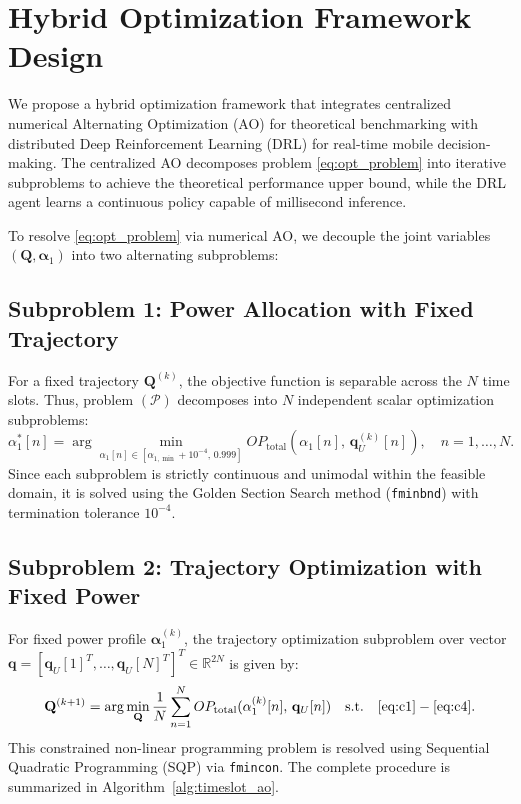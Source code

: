 \section{Hybrid Optimization Framework Design}
\label{sec:framework_design}

We propose a hybrid optimization framework that integrates centralized numerical Alternating Optimization (AO) for theoretical benchmarking with distributed Deep Reinforcement Learning (DRL) for real-time mobile decision-making. The centralized AO decomposes problem \eqref{eq:opt_problem} into iterative subproblems to achieve the theoretical performance upper bound, while the DRL agent learns a continuous policy capable of millisecond inference.

To resolve \eqref{eq:opt_problem} via numerical AO, we decouple the joint variables $(\mathbf{Q}, \boldsymbol{\alpha}_1)$ into two alternating subproblems:

\subsection{Subproblem 1: Power Allocation with Fixed Trajectory}
For a fixed trajectory $\mathbf{Q}^{(k)}$, the objective function is separable across the $N$ time slots. Thus, problem $(\mathcal{P})$ decomposes into $N$ independent scalar optimization subproblems:
\begin{equation}
    \alpha_1^*[n] = \arg\min_{\alpha_1[n] \in [\alpha_{1,\min} + 10^{-4}, \, 0.999]} OP_{\text{total}}(\alpha_1[n], \, \mathbf{q}_U^{(k)}[n]), \quad n = 1, \dots, N.
\end{equation}
Since each subproblem is strictly continuous and unimodal within the feasible domain, it is solved using the Golden Section Search method (\texttt{fminbnd}) with termination tolerance $10^{-4}$.

\subsection{Subproblem 2: Trajectory Optimization with Fixed Power}
For fixed power profile $\boldsymbol{\alpha}_1^{(k)}$, the trajectory optimization subproblem over vector $\mathbf{q} = [\mathbf{q}_U[1]^T, \dots, \mathbf{q}_U[N]^T]^T \in \mathbb{R}^{2N}$ is given by:
\begin{equation}
    \mathbf{Q}^{(k+1)} = \arg\min_{\mathbf{Q}} \frac{1}{N} \sum_{n=1}^N OP_{\text{total}}(\alpha_1^{(k)}[n], \, \mathbf{q}_U[n]) \quad \text{s.t.} \quad \eqref{eq:c1}-\eqref{eq:c4}.
\end{equation}
This constrained non-linear programming problem is resolved using Sequential Quadratic Programming (SQP) via \texttt{fmincon}. The complete procedure is summarized in Algorithm~\ref{alg:timeslot_ao}.


